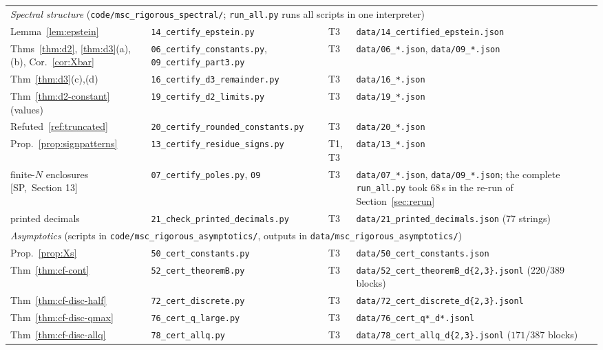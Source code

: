 \documentclass[10pt,a4paper]{article}
\theoremstyle{plain}
\theoremstyle{definition}
\newcommand{\src}[2]{[\textsf{#1},~#2]}           %
\newcommand{\SPE}{\textsf{SP}}
\begin{document}
\begin{center}
\begin{longtable}{p{}p{}p{}p{}}
\midrule
\multicolumn{4}{p{0.9\textwidth}}{\emph{Spectral structure} (\texttt{code/msc\_rigorous\_spectral/}; \texttt{run\_all.py} runs all scripts in one interpreter)}\\
Lemma~\ref{lem:epstein} & \texttt{14\_certify\_epstein.py} & T3 & \texttt{data/14\_certified\_epstein.json}\\
Thms~\ref{thm:d2}, \ref{thm:d3}(a),(b), Cor.~\ref{cor:Xbar} & \texttt{06\_certify\_constants.py}, \texttt{09\_certify\_part3.py} & T3 & \texttt{data/06\_*.json}, \texttt{data/09\_*.json}\\
Thm~\ref{thm:d3}(c),(d) & \texttt{16\_certify\_d3\_remainder.py} & T3 & \texttt{data/16\_*.json}\\
Thm~\ref{thm:d2-constant} (values) & \texttt{19\_certify\_d2\_limits.py} & T3 & \texttt{data/19\_*.json}\\
Refuted~\ref{ref:truncated} & \texttt{20\_certify\_rounded\_constants.py} & T3 & \texttt{data/20\_*.json}\\
Prop.~\ref{prop:signpatterns} & \texttt{13\_certify\_residue\_signs.py} & T1, T3 & \texttt{data/13\_*.json}\\
finite-$N$ enclosures \src{\SPE}{Section 13} & \texttt{07\_certify\_poles.py}, \texttt{09} & T3 & \texttt{data/07\_*.json}, \texttt{data/09\_*.json}; the complete \texttt{run\_all.py} took 68\,s in the re-run of Section~\ref{sec:rerun}\\
printed decimals & \texttt{21\_check\_printed\_decimals.py} & T3 & \texttt{data/21\_printed\_decimals.json} (77 strings)\\
\midrule
\multicolumn{4}{p{0.9\textwidth}}{\emph{Asymptotics} (scripts in \texttt{code/msc\_rigorous\_asymptotics/}, outputs in \texttt{data/msc\_rigorous\_asymptotics/})}\\
Prop.~\ref{prop:Xs} & \texttt{50\_cert\_constants.py} & T3 & \texttt{data/50\_cert\_constants.json}\\
Thm~\ref{thm:cf-cont} & \texttt{52\_cert\_theoremB.py} & T3 & \texttt{data/52\_cert\_theoremB\_d\{2,3\}.jsonl} ($220$/$389$ blocks)\\
Thm~\ref{thm:cf-disc-half} & \texttt{72\_cert\_discrete.py} & T3 & \texttt{data/72\_cert\_discrete\_d\{2,3\}.jsonl}\\
Thm~\ref{thm:cf-disc-qmax} & \texttt{76\_cert\_q\_large.py} & T3 & \texttt{data/76\_cert\_q*\_d*.jsonl}\\
Thm~\ref{thm:cf-disc-allq} & \texttt{78\_cert\_allq.py} & T3 & \texttt{data/78\_cert\_allq\_d\{2,3\}.jsonl} ($171$/$387$ blocks)\\

\end{longtable}
\end{center}
\end{document}
